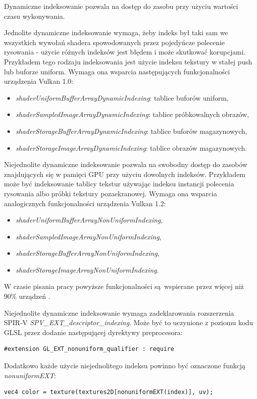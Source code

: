 Dynamiczne indeksowanie pozwala na dostęp do zasobu przy użyciu wartości czasu wykonywania.

Jednolite dynamiczne indeksowanie wymaga, żeby indeks był taki sam we wszystkich wywołań shadera spowodowanych przez pojedyńcze polecenie rysowania - użycie różnych indeksów jest błędem i może skutkować korupcjami.
Przykładem tego rodzaju indeksowania jest użycie indeksu tekstury w stałej push lub buforze uniform.
Wymaga ona wsparcia następujących funkcjonalności urządzenia Vulkan 1.0:
\begin{itemize}
	\item {\textit{shaderUniformBufferArrayDynamicIndexing}}: tablice buforów uniform,
	\item {\textit{shaderSampledImageArrayDynamicIndexing}}: tablice próbkowalnych obrazów,
	\item {\textit{shaderStorageBufferArrayDynamicIndexing}}: tablice buforów magazynowych,
	\item {\textit{shaderStorageImageArrayDynamicIndexing}}: tablice obrazów magazynowych.
\end{itemize}

Niejednolite dynamiczne indeksowanie pozwala na swobodny dostęp do zasobów znajdujących się w pamięci GPU przy użyciu dowolnych indeksów.
Przykładem może być indeksowanie tablicy tekstur używając indeksu instancji polecenia rysowania albo próbki tekstury pozaekranowej.
Wymaga ona wsparcia analogicznych funkcjonalności urządzenia Vulkan 1.2:
\begin{itemize}
	\item {\textit{shaderUniformBufferArrayNonUniformIndexing}},
	\item {\textit{shaderSampledImageArrayNonUniformIndexing}},
	\item {\textit{shaderStorageBufferArrayNonUniformIndexing}},
	\item {\textit{shaderStorageImageArrayNonUniformIndexing}}.
\end{itemize}

W czasie pisania pracy powyższe funkcjonalności są wspierane przez więcej niż $90\%$ urządzeń \cite{GPUINFO}.

Niejednolite dynamiczne indeksowanie wymaga zadeklarowania rozszerzenia SPIR-V \textit{SPV\_EXT\_descriptor\_indexing}.
Może być to uczynione z poziomu kodu GLSL przez dodanie następującej dyrektywy preprocesora:
\lstset{language=GLSL}
\begin{lstlisting}
#extension GL_EXT_nonuniform_qualifier : require
\end{lstlisting}
Dodatkowo każde użycie niejednolitego indeksu powinno być oznaczone funkcją \textit{nonuniformEXT}:
\lstset{language=GLSL}
\begin{lstlisting}
vec4 color = texture(textures2D[nonuniformEXT(index)], uv);
\end{lstlisting}

